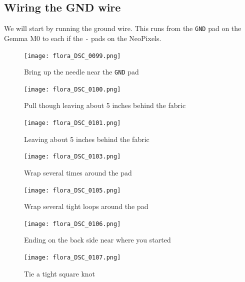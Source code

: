 \documentclass[letterpaper,twoside,12pt]{article}
\begin{document}
\subsection{Wiring the GND wire}
We will start by running the ground wire.  This runs from the \texttt{GND} pad 
on the Gemma M0 to each if the \texttt{-} pads on the NeoPixels.
\begin{figure}[hbpt]\begin{centering}%
\texttt{[image: flora\_DSC\_0099.png]}
\caption{Bring up the needle near the \texttt{GND} pad}
\label{fig:flora_DSC_0099}
\end{centering}\end{figure}
\begin{figure}[hbpt]\begin{centering}%
\texttt{[image: flora\_DSC\_0100.png]}
\caption{Pull though leaving about 5 inches behind the fabric}
\label{fig:flora_DSC_0100}
\end{centering}\end{figure}
\begin{figure}[hbpt]\begin{centering}%
\texttt{[image: flora\_DSC\_0101.png]}
\caption{Leaving about 5 inches behind the fabric}
\label{fig:flora_DSC_0101}
\end{centering}\end{figure}
\begin{figure}[hbpt]\begin{centering}%
\texttt{[image: flora\_DSC\_0103.png]}
\caption{Wrap several times around the pad}
\label{fig:flora_DSC_0103}
\end{centering}\end{figure}
\begin{figure}[hbpt]\begin{centering}%
\texttt{[image: flora\_DSC\_0105.png]}
\caption{Wrap several tight loops around the pad}
\label{fig:flora_DSC_0105}
\end{centering}\end{figure}
\begin{figure}[hbpt]\begin{centering}%
\texttt{[image: flora\_DSC\_0106.png]}
\caption{Ending on the back side near where you started}
\label{fig:flora_DSC_0106}
\end{centering}\end{figure}
\begin{figure}[hbpt]\begin{centering}%
\texttt{[image: flora\_DSC\_0107.png]}
\caption{Tie a tight square knot}
\label{fig:flora_DSC_0107}
\end{centering}\end{figure}
\end{document}
